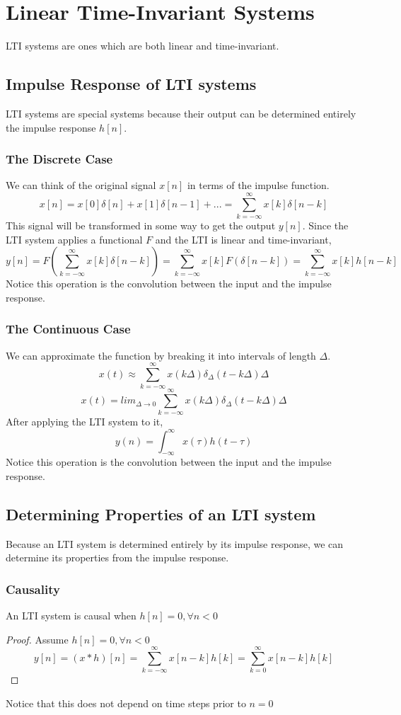 \section{Linear Time-Invariant Systems}
\begin{definition}
    LTI systems are ones which are both linear and time-invariant.
\end{definition}
\subsection{Impulse Response of LTI systems}
LTI systems are special systems because their output can be determined entirely the impulse response $h[n]$.
\subsubsection{The Discrete Case}
We can think of the original signal $x[n]$ in terms of the impulse function.
\[
x[n] = x[0]\delta[n]+x[1]\delta[n-1]+... = \sum_{k=-\infty}^{\infty}{x[k]\delta[n-k]}
\]
This signal will be transformed in some way to get the output $y[n]$.
Since the LTI system applies a functional $F$ and the LTI is linear and time-invariant,
\[
y[n] = F\left(\sum_{k=-\infty}^{\infty}{x[k]\delta[n-k]}\right) = \sum_{k=-\infty}^{\infty}{x[k]F(\delta[n-k])} = \sum_{k=-\infty}^{\infty}{x[k]h[n-k]}
\]
Notice this operation is the convolution between the input and the impulse response.
\subsubsection{The Continuous Case}
We can approximate the function by breaking it into intervals of length $\Delta$.
\[
x(t) \approx \sum_{k=-\infty}^{\infty}{x(k\Delta)\delta_{\Delta}(t-k\Delta)\Delta}
\]
\[
x(t) = lim_{\Delta \rightarrow 0}\sum_{k=-\infty}^{\infty}{x(k\Delta)\delta_{\Delta}(t-k\Delta)\Delta}
\]
After applying the LTI system to it,
\[
y(n) = \int_{-\infty}^{\infty}{x(\tau)h(t-\tau)}
\]
Notice this operation is the convolution between the input and the impulse response.
\subsection{Determining Properties of an LTI system}
Because an LTI system is determined entirely by its impulse response, we can determine its properties from the impulse response.
\subsubsection{Causality}
\begin{theorem}
    An LTI system is causal when $h[n] = 0, \forall n < 0$
\end{theorem}
\begin{proof}
Assume $h[n] = 0, \forall n < 0$
\[
y[n] = (x*h)[n] = \sum_{k=-\infty}^{\infty}{x[n-k]h[k]}=\sum_{k=0}^{\infty}{x[n-k]h[k]}
\]
\end{proof}
Notice that this does not depend on time steps prior to $n=0$
